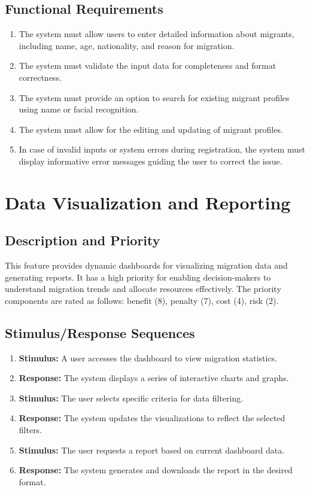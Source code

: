 \documentclass{scrreprt}
\begin{document}
\subsection{Functional Requirements}
\begin{enumerate}[label=REQ-\arabic*:,series=func-req, leftmargin=60pt]
    \item The system must allow users to enter detailed information about migrants, including name, age, nationality, and reason for migration.
    \item The system must validate the input data for completeness and format correctness.
    \item The system must provide an option to search for existing migrant profiles using name or facial recognition.
    \item The system must allow for the editing and updating of migrant profiles.
    \item In case of invalid inputs or system errors during registration, the system must display informative error messages guiding the user to correct the issue.
\end{enumerate}

\section{Data Visualization and Reporting}
\subsection{Description and Priority}
This feature provides dynamic dashboards for visualizing migration data and generating reports. It has a high priority for enabling decision-makers to understand migration trends and allocate resources effectively. The priority components are rated as follows: benefit (8), penalty (7), cost (4), risk (2).
\subsection{Stimulus/Response Sequences}
\begin{enumerate}
    \item \textbf{Stimulus:} A user accesses the dashboard to view migration statistics.
    \item \textbf{Response:} The system displays a series of interactive charts and graphs.
    \item \textbf{Stimulus:} The user selects specific criteria for data filtering.
    \item \textbf{Response:} The system updates the visualizations to reflect the selected filters.
    \item \textbf{Stimulus:} The user requests a report based on current dashboard data.
    \item \textbf{Response:} The system generates and downloads the report in the desired format.
\end{enumerate}
\end{document}
